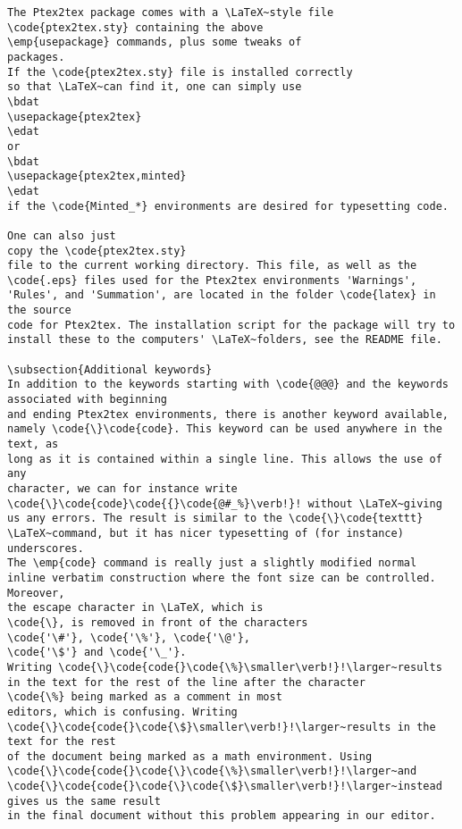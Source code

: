 \documentclass[a4paper,11pt]{article}
\begin{document}
{{{{{{{{{{{\begin{Verbatim}
The Ptex2tex package comes with a \LaTeX~style file
\code{ptex2tex.sty} containing the above 
\emp{usepackage} commands, plus some tweaks of
packages.
If the \code{ptex2tex.sty} file is installed correctly
so that \LaTeX~can find it, one can simply use
\bdat
\usepackage{ptex2tex}
\edat
or
\bdat
\usepackage{ptex2tex,minted}
\edat
if the \code{Minted_*} environments are desired for typesetting code.

One can also just
copy the \code{ptex2tex.sty} 
file to the current working directory. This file, as well as the
\code{.eps} files used for the Ptex2tex environments 'Warnings',
'Rules', and 'Summation', are located in the folder \code{latex} in the source
code for Ptex2tex. The installation script for the package will try to
install these to the computers' \LaTeX~folders, see the README file.

\subsection{Additional keywords}
In addition to the keywords starting with \code{@@@} and the keywords
associated with beginning
and ending Ptex2tex environments, there is another keyword available,
namely \code{\}\code{code}. This keyword can be used anywhere in the text, as
long as it is contained within a single line. This allows the use of any
character, we can for instance write 
\code{\}\code{code}\code{{}\code{@#_%}\verb!}! without \LaTeX~giving
us any errors. The result is similar to the \code{\}\code{texttt}
\LaTeX~command, but it has nicer typesetting of (for instance) underscores.
The \emp{code} command is really just a slightly modified normal 
inline verbatim construction where the font size can be controlled. 
Moreover,
the escape character in \LaTeX, which is
\code{\}, is removed in front of the characters 
\code{'\#'}, \code{'\%'}, \code{'\@'},
\code{'\$'} and \code{'\_'}. 
Writing \code{\}\code{code{}\code{\%}\smaller\verb!}!\larger~results
in the text for the rest of the line after the character 
\code{\%} being marked as a comment in most
editors, which is confusing. Writing
\code{\}\code{code{}\code{\$}\smaller\verb!}!\larger~results in the text for the rest
of the document being marked as a math environment. Using
\code{\}\code{code{}\code{\}\code{\%}\smaller\verb!}!\larger~and
\code{\}\code{code{}\code{\}\code{\$}\smaller\verb!}!\larger~instead gives us the same result
in the final document without this problem appearing in our editor.


\end{Verbatim}}}}}}}}}}}}
\end{document}
